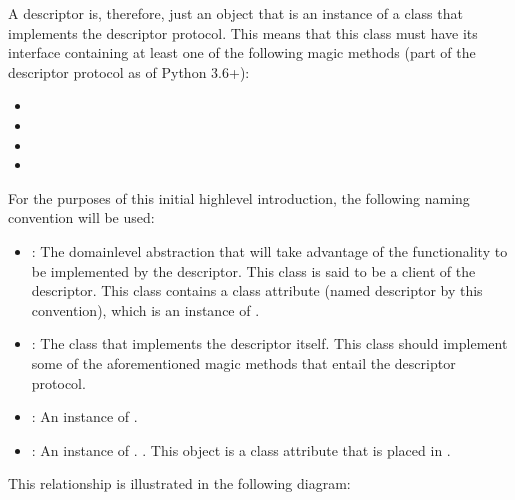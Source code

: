 \documentclass[a4paper,10pt,english]{sphinxmanual}
\begin{document}
A descriptor is, therefore, just an object that is an instance of a class that implements the
descriptor protocol. This means that this class must have its interface containing at least one
of the following magic methods (part of the descriptor protocol as of Python 3.6+):
\begin{itemize}
\item {} 

\item {} 

\item {} 

\item {} 

\end{itemize}

For the purposes of this initial high\sphinxhyphen{}level introduction, the following naming convention
will be used:
\begin{itemize}
\item {} 
: The domain\sphinxhyphen{}level abstraction that will take advantage of the functionality to be implemented by the descriptor. This class is said to be a client of the descriptor. This class contains a class attribute (named descriptor by this convention), which is an instance of .

\item {} 
: The class that implements the descriptor itself. This class should implement some of the aforementioned magic methods that entail the descriptor protocol.

\item {} 
: An instance of . 

\item {} 
: An instance of . . This object is a class attribute that is placed in .

\end{itemize}

This relationship is illustrated in the following diagram:

\begin{figure}[H]
\centering

\noindent{}
\end{figure}
\end{document}
